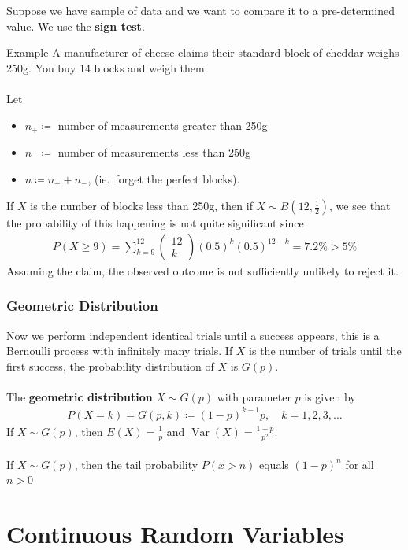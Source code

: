 \documentclass{report}
\newcommand{\cvec}[1]{ \begin{pmatrix} #1 \end{pmatrix} }
\begin{document}
\begin{enumerate}
		Suppose we have sample of data and we want to compare it to a pre-determined value. We use the \textbf{sign test}.
		\begin{question}{Example}
			A manufacturer of cheese claims their standard block of cheddar weighs 250g. You buy 14 blocks and weigh them.
			\\ \\
			Let
			\begin{itemize}
				\item $n_+ \coloneq$ number of measurements greater than 250g
				\item $n_- \coloneq$ number of measurements less than 250g
				\item $n \coloneq n_+ + n_-$, (ie.\ forget the perfect blocks).
			\end{itemize}
			If $X$ is the number of blocks less than 250g, then if $X \sim B(12, \frac{1}{2})$, we see that the probability of this happening is not quite significant since
			\begin{align*}
				P(X \geq 9) = \sum_{k=9}^{12} \cvec{12\\k}(0.5)^k(0.5)^{12-k} = 7.2\% > 5\%
			\end{align*}
			Assuming the claim, the observed outcome is not sufficiently unlikely to reject it.
		\end{question}

	\subsection{Geometric Distribution}

		Now we perform independent identical trials until a success appears, this is a Bernoulli process with infinitely many trials. If $X$ is the number of trials until the first success, the probability distribution of $X$ is $G(p)$.
		\\ \\
		The \textbf{geometric distribution} $X \sim G(p)$ with parameter $p$ is given by
		\begin{align*}
			P(X = k) = G(p,k) \coloneq (1 - p)^{k-1} p, \quad k = 1,2,3,\dots
		\end{align*}
		If $X \sim G(p)$, then $E(X) = \frac{1}{p}$ and $\operatorname{Var}(X) = \frac{1-p}{p^2}$.
		\\ \\
		If $X \sim G(p)$, then the tail probability $P(x > n)$ equals $(1 - p)^n$ for all $n > 0$

\chapter{Continuous Random Variables}


\end{enumerate}
\end{document}
